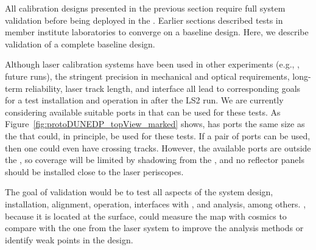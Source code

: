 

All calibration designs presented in the previous section require full system validation before being deployed in the  . Earlier sections described tests in member institute laboratories 
to converge on a baseline design. Here, we describe validation of a complete baseline design.

Although laser calibration systems have been used
in other  experiments (e.g., , future  runs), the stringent precision 
in mechanical and optical requirements, long-term reliability, laser track length, and  interface 
all lead to corresponding goals for a test installation and operation in  after the LS2 run. We are currently considering available suitable ports in  that can be used for these tests.
As Figure~\ref{fig:protoDUNEDP_topView_marked} shows,  has ports the same size as the   that could, in principle, be used for these tests. If a pair of ports can be used, then one could even have crossing tracks. However, the available ports are outside the , so coverage will be limited by shadowing from the , and no reflector panels should be installed close to the laser periscopes.

The goal of validation would be to test all aspects of the system design, installation, alignment, operation, interfaces with , and analysis, among others. , because it is located at the surface, could measure the \efield map with cosmics to compare with the one from the laser system to improve the analysis methods or identify weak points in the design. 

